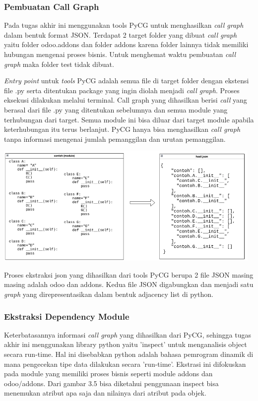 \subsubsection{Pembuatan Call Graph}
Pada tugas akhir ini menggunakan tools PyCG untuk menghasilkan \textit{call graph} dalam bentuk format JSON. Terdapat 2 target folder yang dibuat \textit{call graph} yaitu folder odoo.addons dan folder addons karena folder lainnya tidak memiliki hubungan mengenai proses bisnis. Untuk menghemat waktu pembuatan \textit{call graph} maka folder test tidak dibuat.  

\textit{Entry point} untuk \textit{tools} PyCG adalah semua file di target folder dengan ekstensi file .py serta ditentukan package yang ingin diolah menjadi \textit{call graph}. Proses eksekusi dilakukan melalui terminal. Call graph yang dihasilkan berisi \textit{call} yang berasal dari file .py yang ditentukan sebelumnya dan semua module yang terhubungan dari target. Semua module ini bisa diluar dari target module apabila keterhubungan itu terus berlanjut. PyCG hanya bisa menghasilkan \textit{call graph} tanpa informasi mengenai jumlah pemanggilan dan urutan pemanggilan.

\begin{center}
	\includegraphics[width=13cm]{img/bab_3/soToCG.png}
	\label{contoh_json_pycg}
\end{center}

Proses ekstraksi json yang dihasilkan dari tools PyCG berupa 2 file JSON masing masing adalah odoo dan addons. Kedua file JSON digabungkan dan menjadi satu \textit{graph} yang direpresentasikan dalam bentuk adjacency list di python.

\subsubsection{Ekstraksi Dependency Module}
Keterbatasannya informasi \textit{call graph} yang dihasilkan dari PyCG, sehingga tugas akhir ini menggunakan library python yaitu 'inspect' untuk menganalisis object secara run-time. Hal ini disebabkan python adalah bahasa pemrogram dinamik di mana pengecekan tipe data dilakukan secara 'run-time'. Ekstrasi ini difokuskan pada module yang memiliki proses bisnis seperti module addons dan odoo/addons. Dari gambar 3.5 bisa diketahui penggunaan inspect bisa menemukan atribut apa saja dan nilainya dari atribut pada objek. 

